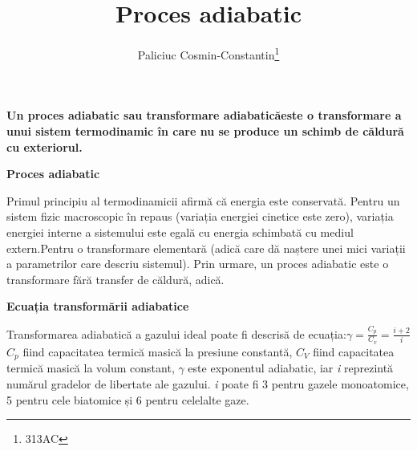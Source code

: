 \documentclass{slides}
\title{Proces adiabatic}
\author{Paliciuc Cosmin-Constantin\footnote{313AC}}
\date{}
\begin{document}
\maketitle
\textbf{Un proces adiabatic sau transformare adiabaticăeste o transformare a unui sistem termodinamic în care nu se produce un schimb de căldură cu exteriorul.}
%
\begin{center}
\textbf{Proces adiabatic}
\end{center}
Primul principiu al termodinamicii afirmă că energia este conservată. Pentru un sistem fizic macroscopic în repaus (variația energiei cinetice este zero), variația energiei interne a sistemului este egală cu energia schimbată cu mediul extern.Pentru o transformare elementară (adică care dă naștere unei mici variații a parametrilor care descriu sistemul). Prin urmare, un proces adiabatic este o transformare fără transfer de căldură, adică.
\begin{center}
\textbf{Ecuația transformării adiabatice}
\end{center}
Transformarea adiabatică a gazului ideal poate fi descrisă de ecuația:\( \gamma  =\frac{C_{p}}{C_{v}} =\frac{i+2}{i}\)\( C_{p}\) fiind capacitatea termică masică la presiune constantă, \( C_{V}\)  fiind capacitatea termică masică la volum constant, \( \gamma\) este exponentul adiabatic, iar \textit{i} reprezintă numărul gradelor de libertate ale gazului. \textit{i} poate fi 3 pentru gazele monoatomice, 5 pentru cele biatomice și 6 pentru celelalte gaze.
\end{document}
